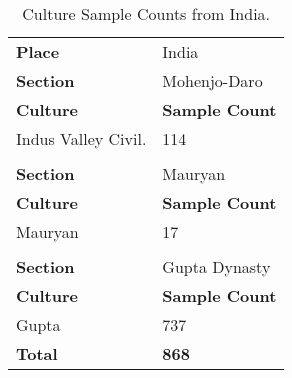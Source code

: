 \documentclass[11pt]{article}
\begin{document}
\begin{table}[ht]
    \centering
    \small
    \begin{tabularx}{\columnwidth}{Xl}
        \hline
        \rowcolor{brown!30}\textbf{Place} & India \\
        \rowcolor{brown!20}\textbf{Section} & Mohenjo-Daro \\
        \hline
        \rowcolor{brown!10}\textbf{Culture} & \textbf{Sample Count} \\
        \hline
        Indus Valley Civil. & 114 \\
          \hline
          & \\
           \hline
          \rowcolor{brown!20}\textbf{Section} & Mauryan \\
     
         \rowcolor{brown!10}\textbf{Culture} & \textbf{Sample Count} \\
        \hline
        Mauryan & 17 \\
        \hline
         & \\
        \hline
        \rowcolor{brown!20}\textbf{Section} & Gupta Dynasty \\
    
        \rowcolor{brown!10}\textbf{Culture} & \textbf{Sample Count} \\
             \hline
        Gupta & 737 \\
        \hline
          \rowcolor{brown!10}\textbf{Total}&\textbf{868}\\
         \hline
    \end{tabularx}
    \caption{Culture Sample Counts from India.}
    \label{tab:tab:culture-sample-ind}
\end{table}
\end{document}

